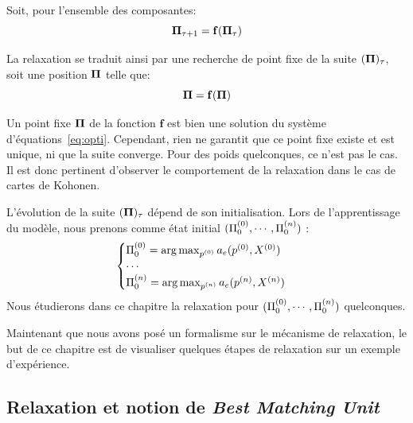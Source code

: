 \documentclass[../main]{subfiles}
\begin{document}
Soit, pour l'ensemble des composantes: 
\begin{equation}
\mathbf{\Pi}_{\tau+1} = \mathbf{f}(\mathbf{\Pi}_\tau)
\end{equation}

La relaxation se traduit ainsi par une recherche de point fixe de la suite $(\mathbf{\Pi})_{\tau}$, soit une position $\mathbf{\Pi}$ telle que:
\begin{equation}
\mathbf{\Pi} = \mathbf{f}(\mathbf{\Pi})
\label{eq:suite}
\end{equation}

Un point fixe $\mathbf{\Pi}$ de la fonction $\mathbf{f}$ est bien une solution du système d'équations~\ref{eq:opti}.
Cependant, rien ne garantit que ce point fixe existe et est unique, ni que la suite converge. Pour des poids quelconques, ce n'est pas le cas. Il est donc pertinent d'observer le comportement de la relaxation dans le cas de cartes de Kohonen.

L'évolution de la suite $(\mathbf{\Pi})_{\tau}$ dépend de son initialisation.
Lors de l'apprentissage du modèle, nous prenons comme état initial $(\Pi^{({0})}_0, \cdots , \Pi^{({n})}_0)$ : 
\begin{equation}
\begin{cases}
\Pi^{({0})}_0 = \operatorname*{arg\,max}_{p^{({0})}} a_e(p^{({0})},X^{({0})})\\
\cdots \\
\Pi^{({n})}_0 = \operatorname*{arg\,max}_{p^{({n})}} a_e(p^{({n})},X^{({n})})\\
\end{cases}
\label{eq:init}
\end{equation}
Nous étudierons dans ce chapitre la relaxation pour $(\Pi^{({0})}_0, \cdots , \Pi^{({n})}_0)$ quelconques.

Maintenant que nous avons posé un formalisme sur le mécanisme de relaxation, le but de ce chapitre est de visualiser quelques étapes de relaxation sur un exemple d'expérience.

\subsection{Relaxation et notion de \emph{Best Matching Unit}}
\end{document}
